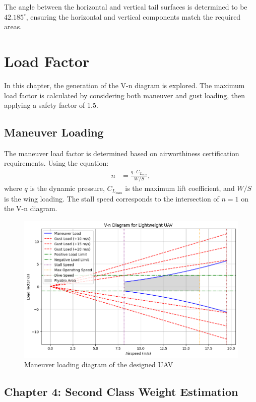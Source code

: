 \documentclass[12pt]{report}
\begin{document}
	The angle between the horizontal and vertical tail surfaces is determined to be $42.185^\circ$, ensuring the horizontal and vertical components match the required areas.
	
	\chapter{Load Factor}
	
	In this chapter, the generation of the V-n diagram is explored. The maximum load factor is calculated by considering both maneuver and gust loading, then applying a safety factor of 1.5. 
	
	\section{Maneuver Loading}
	
	The maneuver load factor is determined based on airworthiness certification requirements. Using the equation:
	\begin{align}
		n &= \frac{q \cdot C_{L_{\text{max}}}}{W/S},
	\end{align}
	where $q$ is the dynamic pressure, $C_{L_{\text{max}}}$ is the maximum lift coefficient, and $W/S$ is the wing loading. The stall speed corresponds to the intersection of $n=1$ on the V-n diagram.
	
	\begin{figure}[h!]
		\centering
		\includegraphics[width=6.5in]{Figures/VNdiagram.png} %
		\caption{Maneuver loading diagram of the designed UAV}
		\label{fig:VNDIagram}
	\end{figure}
\newpage
\section{Chapter 4: Second Class Weight Estimation}
\end{document}
